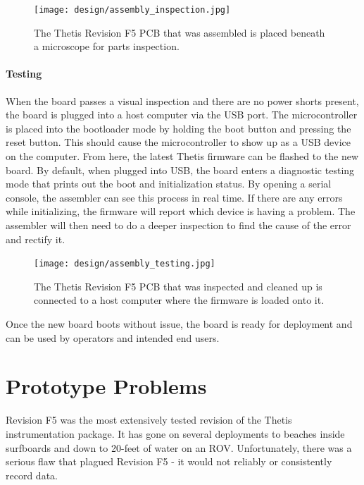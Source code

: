 \begin{figure}[h!]
	\centering
	\texttt{[image: design/assembly\_inspection.jpg]}
	\caption[PCB inspection after assembly]{The Thetis Revision F5 PCB that was assembled is placed beneath a microscope for parts inspection.}
\end{figure}

\paragraph*{Testing} When the board passes a visual inspection and there are no power shorts present, the board is plugged into a host computer via the USB port.
The microcontroller is placed into the bootloader mode by holding the boot button and pressing the reset button.
This should cause the microcontroller to show up as a USB device on the computer.
From here, the latest Thetis firmware can be flashed to the new board.
By default, when plugged into USB, the board enters a diagnostic testing mode that prints out the boot and initialization status.
By opening a serial console, the assembler can see this process in real time.
If there are any errors while initializing, the firmware will report which device is having a problem.
The assembler will then need to do a deeper inspection to find the cause of the error and rectify it.

\begin{figure}[h!]
	\centering
	\texttt{[image: design/assembly\_testing.jpg]}
	\caption[PCB firmware loading and testing after inspection]{The Thetis Revision F5 PCB that was inspected and cleaned up is connected to a host computer where the firmware is loaded onto it.}
\end{figure}

Once the new board boots without issue, the board is ready for deployment and can be used by operators and intended end users.

\section{Prototype Problems} 
Revision F5 was the most extensively tested revision of the Thetis instrumentation package.
It has gone on several deployments to beaches inside surfboards and down to 20-feet of water on an ROV.
Unfortunately, there was a serious flaw that plagued Revision F5 - it would not reliably or consistently record data.

